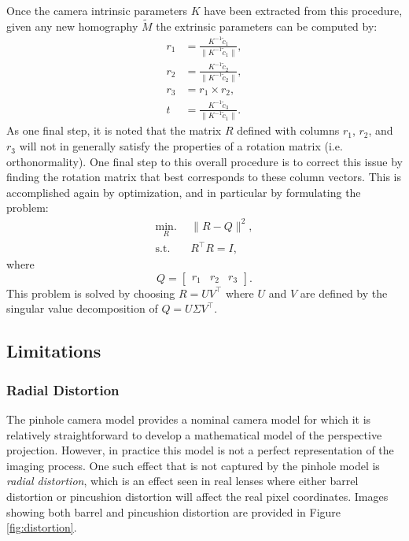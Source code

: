 Once the camera intrinsic parameters $K$ have been extracted from this procedure, given any new homography $\tilde{M}$ the extrinsic parameters can be computed by:
\begin{equation}
\begin{split}
    r_1 &= \frac{K^{-1}\tilde{c}_1}{\lVert K^{-1}\tilde{c}_1 \rVert}, \\
    r_2 &= \frac{K^{-1}\tilde{c}_2}{\lVert K^{-1}\tilde{c}_2 \rVert}, \\
    r_3 &= r_1 \times r_2, \\
    t &= \frac{K^{-1}\tilde{c}_3}{\lVert K^{-1}\tilde{c}_1 \rVert}.
\end{split}
\end{equation}
As one final step, it is noted that the matrix $R$ defined with columns $r_1$, $r_2$, and $r_3$ will not in generally satisfy the properties of a rotation matrix (i.e. orthonormality). One final step to this overall procedure is to correct this issue by finding the rotation matrix that best corresponds to these column vectors. This is accomplished again by optimization, and in particular by formulating the problem:
\begin{equation} \label{eq:Ropt}
\begin{split}
\underset{R}{\text{min.}} \:\:& \lVert R - Q \rVert^2, \\
    \text{s.t.}\:\:& R^\top R = I,
\end{split}
\end{equation}
where
\begin{equation*}
    Q = \begin{bmatrix}
        r_1 & r_2 & r_3
    \end{bmatrix}.
\end{equation*}
This problem is solved by choosing $R = UV^\top $ where $U$ and $V$ are defined by the singular value decomposition of $Q = U\Sigma V^\top $.

\subsection{Limitations}

\subsubsection{Radial Distortion}
The pinhole camera model provides a nominal camera model for which it is relatively straightforward to develop a mathematical model of the perspective projection. However, in practice this model is not a perfect representation of the imaging process. One such effect that is not captured by the pinhole model is \textit{radial distortion}, which is an effect seen in real lenses where either barrel distortion or pincushion distortion will affect the real pixel coordinates. Images showing both barrel and pincushion distortion are provided in Figure \ref{fig:distortion}.

